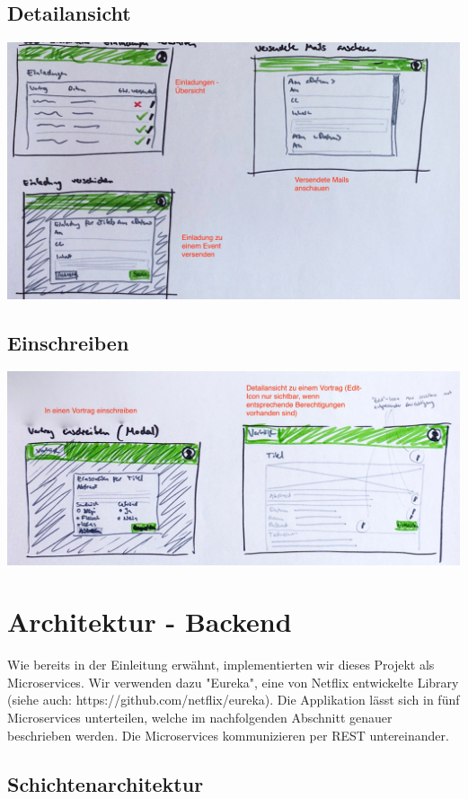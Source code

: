 \documentclass[11pt]{article} %
\begin{document}
\subsection{Detailansicht}
\includegraphics[width=1\textwidth]{prototyp/Einladungen}

\subsection{Einschreiben}
\includegraphics[width=1\textwidth]{prototyp/Vortrag}

\newpage
\section{Architektur - Backend}
Wie bereits in der Einleitung erwähnt, implementierten wir dieses Projekt als Microservices. Wir verwenden dazu "Eureka", eine von Netflix entwickelte Library (siehe auch: https://github.com/netflix/eureka). Die Applikation lässt sich in fünf Microservices unterteilen, welche im nachfolgenden Abschnitt genauer beschrieben werden. Die Microservices kommunizieren per REST untereinander.

\subsection{Schichtenarchitektur}
\end{document}
